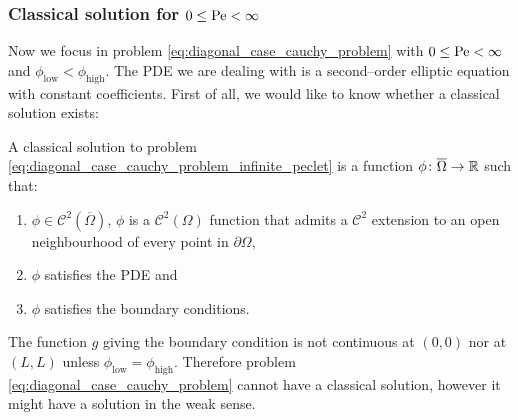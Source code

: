\subsubsection{Classical solution for \texorpdfstring{$0 \leq \mathrm{Pe} <
\infty$}{finite Péclet's number}}

Now we focus in problem \eqref{eq:diagonal_case_cauchy_problem} with $0 \leq
\mathrm{Pe} < \infty$ and $\phi_\text{low} < \phi_\text{high}$. The PDE we are
dealing with is a second--order elliptic equation with constant coefficients.
First of all, we would like to know whether a classical solution exists:

\begin{definition}
	A classical solution to problem
	\eqref{eq:diagonal_case_cauchy_problem_infinite_peclet} is a function $\phi
	\colon \overline{\Omega} \rightarrow \mathbb{R}$ such that:
	\begin{enumerate}[label={(\roman*)}, topsep=0pt]
		\item $\phi \in \mathcal{C}^2(\overline{\Omega})$, \ie $\phi$ is a
		$\mathcal{C}^2(\Omega)$ function that admits a $\mathcal{C}^2$ extension
		to an open neighbourhood of every point in $\partial \Omega$,
		\item $\phi$ satisfies the PDE and
		\item $\phi$ satisfies the boundary conditions.
	\end{enumerate}
\end{definition}

\noindent
The function $g$ giving the boundary condition is not continuous at $(0,0)$ nor
at $(L, L)$ unless $\phi_\text{low} = \phi_\text{high}$. Therefore problem
\eqref{eq:diagonal_case_cauchy_problem} cannot have a classical solution,
however it might have a solution in the weak sense.

